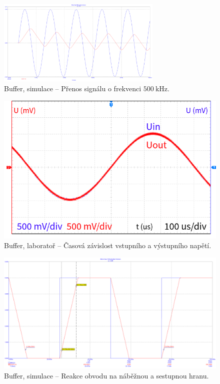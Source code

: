 \documentclass{protokol}
\begin{document}
	\begin{figure}[h!]
		\centering
		\includegraphics[width=0.7\textwidth]{numerika/Buffer/4_500k_sin_1V.png}
		\centering
		\caption{Buffer, simulace -- Přenos signálu o frekvenci $ \qty{500}{\kilo\hertz} $.}
		\label{fig:b-s-prenos2}
	\end{figure}

	\begin{figure}[h!]
		\centering
		\includegraphics[width=\textwidth]{oscilo/output1.png}
		\centering
		\caption{Buffer, laboratoř -- Časová závislost vstupního a výstupního napětí.}
		\label{fig:b-l-prenos}
	\end{figure}



	\begin{figure}[h!]
		\centering
		\includegraphics[width=\textwidth]{numerika/Buffer/2_SlewRate.png}
		\centering
		\caption{Buffer, simulace -- Reakce obvodu na náběžnou a sestupnou hranu.}
		\label{fig:b-s-slewrate}
	\end{figure}
\end{document}
